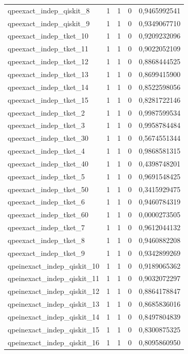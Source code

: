 \begin{longtable}{lrrrr}
qpeexact\_indep\_qiskit\_8 & 1 & 1 & 0 & 0,9465992541 \\
qpeexact\_indep\_qiskit\_9 & 1 & 1 & 0 & 0,9349067710 \\
qpeexact\_indep\_tket\_10 & 1 & 1 & 0 & 0,9209232096 \\
qpeexact\_indep\_tket\_11 & 1 & 1 & 0 & 0,9022052109 \\
qpeexact\_indep\_tket\_12 & 1 & 1 & 0 & 0,8868444525 \\
qpeexact\_indep\_tket\_13 & 1 & 1 & 0 & 0,8699415900 \\
qpeexact\_indep\_tket\_14 & 1 & 1 & 0 & 0,8522598056 \\
qpeexact\_indep\_tket\_15 & 1 & 1 & 0 & 0,8281722146 \\
qpeexact\_indep\_tket\_2 & 1 & 1 & 0 & 0,9987599534 \\
qpeexact\_indep\_tket\_3 & 1 & 1 & 0 & 0,9958784484 \\
qpeexact\_indep\_tket\_30 & 1 & 1 & 0 & 0,5674551344 \\
qpeexact\_indep\_tket\_4 & 1 & 1 & 0 & 0,9868581315 \\
qpeexact\_indep\_tket\_40 & 1 & 1 & 0 & 0,4398748201 \\
qpeexact\_indep\_tket\_5 & 1 & 1 & 0 & 0,9691548425 \\
qpeexact\_indep\_tket\_50 & 1 & 1 & 0 & 0,3415929475 \\
qpeexact\_indep\_tket\_6 & 1 & 1 & 0 & 0,9460784319 \\
qpeexact\_indep\_tket\_60 & 1 & 1 & 0 & 0,0000273505 \\
qpeexact\_indep\_tket\_7 & 1 & 1 & 0 & 0,9612044132 \\
qpeexact\_indep\_tket\_8 & 1 & 1 & 0 & 0,9460882208 \\
qpeexact\_indep\_tket\_9 & 1 & 1 & 0 & 0,9342899269 \\
qpeinexact\_indep\_qiskit\_10 & 1 & 1 & 0 & 0,9189065362 \\
qpeinexact\_indep\_qiskit\_11 & 1 & 1 & 0 & 0,9032072297 \\
qpeinexact\_indep\_qiskit\_12 & 1 & 1 & 0 & 0,8864178847 \\
qpeinexact\_indep\_qiskit\_13 & 1 & 1 & 0 & 0,8685836016 \\
qpeinexact\_indep\_qiskit\_14 & 1 & 1 & 0 & 0,8497804839 \\
qpeinexact\_indep\_qiskit\_15 & 1 & 1 & 0 & 0,8300875325 \\
qpeinexact\_indep\_qiskit\_16 & 1 & 1 & 0 & 0,8095860950 \\

\end{longtable}
